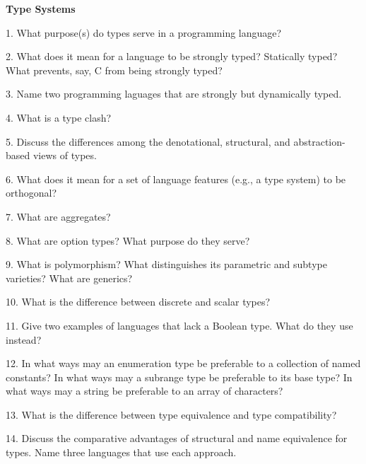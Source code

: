 \centerline{\bf Type Systems}

\vskip 1cm

1. What purpose(s) do types serve in a programming language?

\filbreak
\vskip 1cm

2. What does it mean for a language to be strongly typed? Statically typed? What prevents, say, C from being strongly typed?

\filbreak
\vskip 1cm

3. Name two programming laguages that are strongly but dynamically typed.

\filbreak
\vskip 1cm

4. What is a type clash?

\filbreak
\vskip 1cm

5. Discuss the differences among the denotational, structural, and abstraction-based views of types.

\filbreak
\vskip 1cm

6. What does it mean for a set of language features (e.g., a type system) to be orthogonal?

\filbreak
\vskip 1cm

7. What are aggregates?

\filbreak
\vskip 1cm

8. What are option types? What purpose do they serve?

\filbreak
\vskip 1cm

9. What is polymorphism? What distinguishes its parametric and subtype varieties? What are generics?

\filbreak
\vskip 1cm

10. What is the difference between discrete and scalar types?

\filbreak
\vskip 1cm

11. Give two examples of languages that lack a Boolean type. What do they use instead?

\filbreak
\vskip 1cm

12. In what ways may an enumeration type be preferable to a collection of named constants? In what ways may a subrange type be preferable to its base type? In what ways may a string be preferable to an array of characters?

\filbreak
\vskip 1cm

13. What is the difference between type equivalence and type compatibility?

\filbreak
\vskip 1cm

14. Discuss the comparative advantages of structural and name equivalence for types. Name three languages that use each approach.

